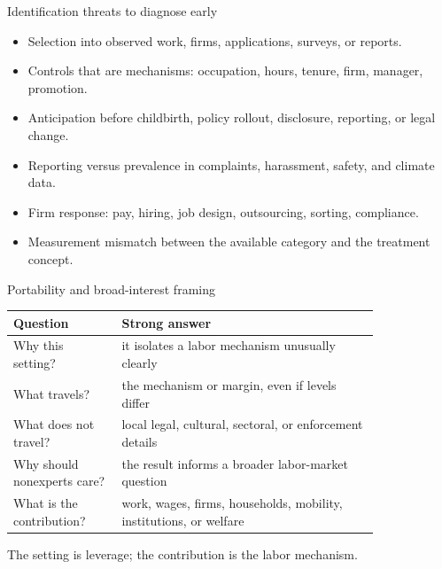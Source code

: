 \documentclass[aspectratio=169,11pt]{beamer}
\begin{document}
\begin{frame}{Identification threats to diagnose early}
\begin{itemize}
    \item Selection into observed work, firms, applications, surveys, or reports.
    \item Controls that are mechanisms: occupation, hours, tenure, firm, manager, promotion.
    \item Anticipation before childbirth, policy rollout, disclosure, reporting, or legal change.
    \item Reporting versus prevalence in complaints, harassment, safety, and climate data.
    \item Firm response: pay, hiring, job design, outsourcing, sorting, compliance.
    \item Measurement mismatch between the available category and the treatment concept.
\end{itemize}
\end{frame}

\begin{frame}{Portability and broad-interest framing}
\scriptsize
\begin{tabular}{p{0.24\linewidth} p{0.58\linewidth}}
\toprule
Question & Strong answer \\
\midrule
Why this setting? & it isolates a labor mechanism unusually clearly \\
What travels? & the mechanism or margin, even if levels differ \\
What does not travel? & local legal, cultural, sectoral, or enforcement details \\
Why should nonexperts care? & the result informs a broader labor-market question \\
What is the contribution? & work, wages, firms, households, mobility, institutions, or welfare \\
\bottomrule
\end{tabular}
\vspace{0.25cm}
The setting is leverage; the contribution is the labor mechanism.
\end{frame}
\end{document}
